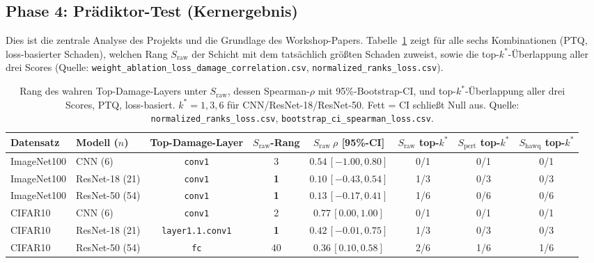 \subsection{Phase 4: Prädiktor-Test (Kernergebnis)}
\label{sec:phase4}

Dies ist die zentrale Analyse des Projekts und die Grundlage des Workshop-Papers. Tabelle~\ref{tab:rank} zeigt für alle sechs Kombinationen (PTQ, loss-basierter Schaden), welchen Rang $S_{\mathrm{raw}}$ der Schicht mit dem tatsächlich größten Schaden zuweist, sowie die top-$k^*$-Überlappung aller drei Scores (Quelle: \texttt{weight\_ablation\_loss\_damage\_correlation.csv}, \texttt{normalized\_ranks\_loss.csv}).

\begin{table}[t]
\centering
\small
\caption{Rang des wahren Top-Damage-Layers unter $S_{\mathrm{raw}}$, dessen Spearman-$\rho$ mit 95\%-Bootstrap-CI, und top-$k^*$-Überlappung aller drei Scores, PTQ, loss-basiert. $k^*=1,3,6$ für CNN/ResNet-18/ResNet-50. Fett = CI schließt Null aus. Quelle: \texttt{normalized\_ranks\_loss.csv}, \texttt{bootstrap\_ci\_spearman\_loss.csv}.}
\label{tab:rank}
\begin{tabular}{llcccccc}
\toprule
Datensatz & Modell ($n$) & Top-Damage-Layer & $S_{\mathrm{raw}}$-Rang & $S_{\mathrm{raw}}\ \rho$ [95\%-CI] & $S_{\mathrm{raw}}$ top-$k^*$ & $S_{\mathrm{pert}}$ top-$k^*$ & $S_{\mathrm{hawq}}$ top-$k^*$ \\
\midrule
ImageNet100 & CNN (6) & \texttt{conv1} & 3 & $0.54\,[-1.00,0.80]$ & 0/1 & 0/1 & 0/1 \\
ImageNet100 & ResNet-18 (21) & \texttt{conv1} & \textbf{1} & $0.10\,[-0.43,0.54]$ & 1/3 & 0/3 & 0/3 \\
ImageNet100 & ResNet-50 (54) & \texttt{conv1} & \textbf{1} & $0.13\,[-0.17,0.41]$ & 1/6 & 0/6 & 0/6 \\
CIFAR10 & CNN (6) & \texttt{conv1} & 2 & $0.77\,[0.00,1.00]$ & 0/1 & 0/1 & 0/1 \\
CIFAR10 & ResNet-18 (21) & \texttt{layer1.1.conv1} & \textbf{1} & $0.42\,[-0.01,0.75]$ & 1/3 & 0/3 & 0/3 \\
CIFAR10 & ResNet-50 (54) & \texttt{fc} & 40 & $\mathbf{0.36\,[0.10,0.58]}$ & 2/6 & 1/6 & 1/6 \\
\bottomrule
\end{tabular}
\end{table}

